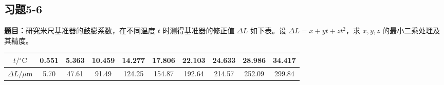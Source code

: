 \documentclass[UTF8,zihao=-4]{ctexart}
\newcommand{\problem}[1]{\subsection*{#1}}
\newcommand{\timu}{\noindent\textbf{题目：}}
\begin{document}
{\newpage

\problem{习题5-6}
\timu 研究米尺基准器的鼓膨系数，在不同温度 $t$ 时测得基准器的修正值 $\Delta L$ 如下表。设 $\Delta L=x+yt+zt^2$，求 $x,y,z$ 的最小二乘处理及其精度。

\begin{center}
\scriptsize
\setlength{\tabcolsep}{4pt}
\begin{tabular}{c|ccccccccc}
\toprule
$t/{}^\circ\mathrm{C}$ & 0.551 & 5.363 & 10.459 & 14.277 & 17.806 & 22.103 & 24.633 & 28.986 & 34.417\\
\midrule
$\Delta L/\mu\mathrm{m}$ & 5.70 & 47.61 & 91.49 & 124.25 & 154.87 & 192.64 & 214.57 & 252.09 & 299.84\\
\bottomrule
\end{tabular}
\end{center}

}
\end{document}
